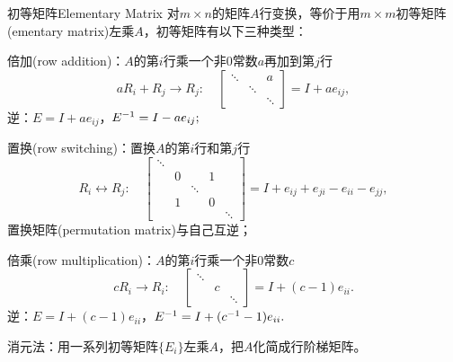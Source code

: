 \begin{definition}{初等矩阵}{Elementary Matrix}
	对$m\times n$的矩阵$A$行变换，等价于用$m\times m$初等矩阵(ementary matrix)左乘$A$，初等矩阵有以下三种类型：
	\begin{compactitem}
		\item 倍加(row addition)：$A$的第$i$行乘一个非0常数$a$再加到第$j$行 
		\[
			aR_i+R_j\to R_j:\quad
			\begin{bmatrix}
				\ddots&&a\\ &\ddots\\ &&\ddots
			\end{bmatrix}=I+ae_{ij},
		\]
		逆：$E=I+ae_{ij}$，$E^{-1}=I-ae_{ij};$
		\item 置换(row switching)：置换$A$的第$i$行和第$j$行 
		\[
			R_i\leftrightarrow R_j:\quad
			\begin{bmatrix}
				\ddots\\ &0&&1\\ &&\ddots\\ &1&&0\\ &&&&\ddots
			\end{bmatrix}=I+e_{ij}+e_{ji}-e_{ii}-e_{jj},
		\]
		置换矩阵(permutation matrix)与自己互逆；
		\item 倍乘(row multiplication)：$A$的第$i$行乘一个非0常数$c$
		\[
			cR_i\to R_i:\quad
			\begin{bmatrix}
				\ddots\\ &c\\ &&\ddots
			\end{bmatrix}=I+(c-1)e_{ii}.
		\]
		逆：$E=I+(c-1)e_{ii}$，$E^{-1}=I+(c^{-1}-1)e_{ii}.$
	\end{compactitem}
\end{definition}
消元法：用一系列初等矩阵$\{E_i\}$左乘$A$，把$A$化简成行阶梯矩阵。
